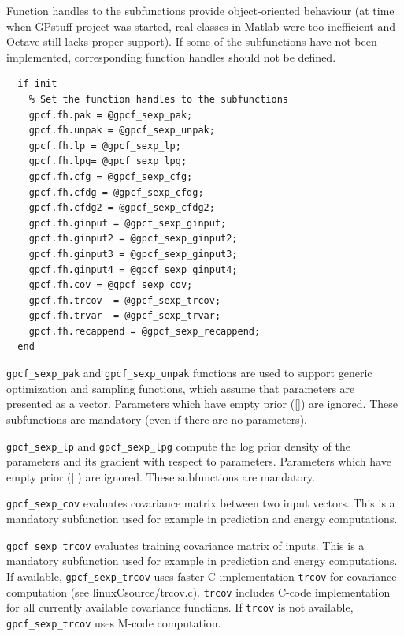 \documentclass[twoside,11pt]{article}
\newcommand{\code}[1]{{\normalfont\texttt{#1}}}
\begin{document}
Function handles to the subfunctions provide object-oriented
behaviour (at time when GPstuff project was started, real classes
in Matlab were too inefficient and Octave still lacks proper support).
If some of the subfunctions have not been implemented,
corresponding function handles should not be defined.
\begin{verbatim}
  if init
    % Set the function handles to the subfunctions
    gpcf.fh.pak = @gpcf_sexp_pak;
    gpcf.fh.unpak = @gpcf_sexp_unpak;
    gpcf.fh.lp = @gpcf_sexp_lp;
    gpcf.fh.lpg= @gpcf_sexp_lpg;
    gpcf.fh.cfg = @gpcf_sexp_cfg;
    gpcf.fh.cfdg = @gpcf_sexp_cfdg;
    gpcf.fh.cfdg2 = @gpcf_sexp_cfdg2;
    gpcf.fh.ginput = @gpcf_sexp_ginput;
    gpcf.fh.ginput2 = @gpcf_sexp_ginput2;
    gpcf.fh.ginput3 = @gpcf_sexp_ginput3;
    gpcf.fh.ginput4 = @gpcf_sexp_ginput4;
    gpcf.fh.cov = @gpcf_sexp_cov;
    gpcf.fh.trcov  = @gpcf_sexp_trcov;
    gpcf.fh.trvar  = @gpcf_sexp_trvar;
    gpcf.fh.recappend = @gpcf_sexp_recappend;
  end
\end{verbatim}

\code{gpcf\_sexp\_pak} and \code{gpcf\_sexp\_unpak} functions are
used to support generic optimization and sampling functions, which
assume that parameters are presented as a vector. Parameters which
have empty prior ([]) are ignored. These subfunctions are
mandatory (even if there are no parameters).

\code{gpcf\_sexp\_lp} and \code{gpcf\_sexp\_lpg} compute the log
prior density of the parameters and its gradient with respect to
parameters. Parameters which have empty prior ([]) are ignored.
These subfunctions are mandatory.

\code{gpcf\_sexp\_cov} evaluates covariance matrix between two
input vectors. This is a mandatory subfunction used for example in
prediction and energy computations.

\code{gpcf\_sexp\_trcov} evaluates training covariance matrix of
inputs. This is a mandatory subfunction used for example in
prediction and energy computations. If available,
\code{gpcf\_sexp\_trcov} uses faster C-implementation \code{trcov}
for covariance computation (see linuxCsource/trcov.c). \code{trcov}
includes C-code implementation for all currently available
covariance functions. If \code{trcov} is not available,
\code{gpcf\_sexp\_trcov} uses M-code computation.
\end{document}
